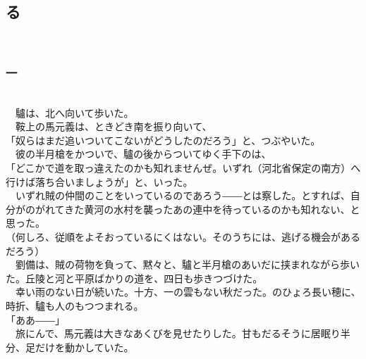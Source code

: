 \documentclass[
  paper=a5,
  fontsize=10pt,
  jafontsize=9.5pt,
  tate,                  %
  open_bracket_pos=nibu, %
]{jlreq}
\begin{document}
\subsection{る}

\\

\subsubsection{一}

\\


　驢は、北へ向いて歩いた。\\


　鞍上の馬元義は、ときどき南を振り向いて、\\


「奴らはまだ追いついてこないがどうしたのだろう」と、つぶやいた。\\


　彼の半月槍をかついで、驢の後からついてゆく手下のは、\\


「どこかで道を取っ違えたのかも知れませんぜ。いずれ（河北省保定の南方）へ行けば落ち合いましょうが」と、いった。\\


　いずれ賊の仲間のことをいっているのであろう――とは察した。とすれば、自分がのがれてきた黄河の水村を襲ったあの連中を待っているのかも知れない、と思った。\\


（何しろ、従順をよそおっているにくはない。そのうちには、逃げる機会があるだろう）\\


　劉備は、賊の荷物を負って、黙々と、驢と半月槍のあいだに挟まれながら歩いた。丘陵と河と平原ばかりの道を、四日も歩きつづけた。\\


　幸い雨のない日が続いた。十方、一の雲もない秋だった。のひょろ長い穂に、時折、驢も人のもつつまれる。\\


「ああ――」\\


　旅にんで、馬元義は大きなあくびを見せたりした。甘もだるそうに居眠り半分、足だけを動かしていた。\\
\end{document}
